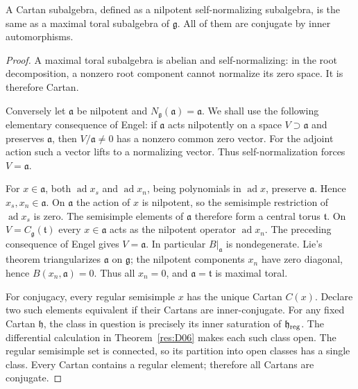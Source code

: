 \begin{theorem}\label{res:D07}
A Cartan subalgebra, defined as a nilpotent self-normalizing
subalgebra, is the same as a maximal toral subalgebra of
\(\mathfrak g\). All of them are conjugate by inner automorphisms.
\end{theorem}
\begin{proof}
A maximal toral subalgebra is abelian and self-normalizing:
in the root decomposition, a nonzero root component cannot
normalize its zero space. It is therefore Cartan.

Conversely let \(\mathfrak a\) be nilpotent and
\(N_{\mathfrak g}(\mathfrak a)=\mathfrak a\).
We shall use the following elementary consequence of Engel:
if \(\mathfrak a\) acts nilpotently on a space \(V\supset\mathfrak a\)
and preserves \(\mathfrak a\), then \(V/\mathfrak a\ne0\)
has a nonzero common zero vector. For the adjoint action such
a vector lifts to a normalizing vector. Thus self-normalization
forces \(V=\mathfrak a\).

For \(x\in\mathfrak a\), both \(\operatorname{ad}x_s\) and
\(\operatorname{ad}x_n\), being polynomials in
\(\operatorname{ad}x\), preserve \(\mathfrak a\).
Hence \(x_s,x_n\in\mathfrak a\).
On \(\mathfrak a\) the action of \(x\) is nilpotent,
so the semisimple restriction of \(\operatorname{ad}x_s\)
is zero. The semisimple elements of \(\mathfrak a\) therefore
form a central torus \(\mathfrak t\).
On \(V=C_{\mathfrak g}(\mathfrak t)\) every \(x\in\mathfrak a\)
acts as the nilpotent operator \(\operatorname{ad}x_n\).
The preceding consequence of Engel gives \(V=\mathfrak a\).
In particular \(B|_{\mathfrak a}\) is nondegenerate.
Lie's theorem triangularizes \(\mathfrak a\) on \(\mathfrak g\);
the nilpotent components \(x_n\) have zero diagonal, hence
\(B(x_n,\mathfrak a)=0\). Thus all \(x_n=0\),
and \(\mathfrak a=\mathfrak t\) is maximal toral.

For conjugacy, every regular semisimple \(x\) has the unique
Cartan \(C(x)\). Declare two such elements equivalent if their
Cartans are inner-conjugate. For any fixed Cartan
\(\mathfrak h\), the class in question is precisely its inner
saturation of \(\mathfrak h_{\rm reg}\).
The differential calculation in Theorem~\ref{res:D06}
makes each such class open. The regular semisimple set is
connected, so its partition into open classes has a single class.
Every Cartan contains a regular element; therefore all Cartans
are conjugate.
\end{proof}

